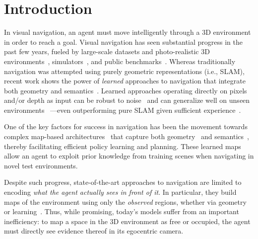 \documentclass[runningheads]{llncs}
\begin{document}
\section{Introduction}


In visual navigation, an agent must move intelligently through a 3D environment in order to reach a goal. Visual navigation has seen substantial progress in the past few years, fueled by large-scale datasets and photo-realistic 3D environments~\cite{stanford2d3d,chang2017matterport,xia2018gibson,replica19arxiv},  simulators~\cite{xia2018gibson,ai2thor,mattersim,habitat19iccv}, and public benchmarks~\cite{das2018embodied,mattersim,habitat19iccv}.  Whereas traditionally navigation was attempted using purely geometric representations (i.e., SLAM), recent work shows the power of \emph{learned} approaches to navigation that integrate both geometry and semantics~\cite{zhu-iccv2017,gupta2017cognitive,savinov2018semi,mousavian2019visual,yang2018visual,chen2019learning}. Learned approaches operating directly on pixels and/or depth as input can be robust to noise~\cite{chen2019learning,chaplot2020learning} and can generalize well on unseen environments~\cite{gupta2017cognitive,habitat19iccv,yang2018visual,chaplot2020learning} \mbox{---even} outperforming pure SLAM given sufficient experience~\cite{habitat19iccv}.


One of the key factors for success in navigation has been the movement towards complex map-based architectures~\cite{gupta2017cognitive,parisotto2017neural,chen2019learning,chaplot2020learning} that capture both geometry~\cite{gupta2017cognitive,chen2019learning,chaplot2020learning} and semantics~\cite{gupta2017cognitive,parisotto2017neural,gordon2018iqa,henriques2018mapnet}, thereby facilitating efficient policy learning and planning. These learned maps allow an agent to exploit prior knowledge from training scenes when navigating in novel test environments.


Despite such progress, state-of-the-art approaches to navigation are limited to encoding \emph{what the agent actually sees in front of it}. In particular, they build maps of the environment  using only the \emph{observed} regions, whether via geometry~\cite{chen2019learning,henriques2018mapnet} or learning~\cite{gupta2017cognitive,parisotto2017neural,gordon2018iqa,chaplot2020learning}. Thus, while promising, today's models suffer from an important inefficiency:  to map a space in the 3D environment as free or occupied, the agent must directly see evidence thereof in its egocentric camera.  
\end{document}
